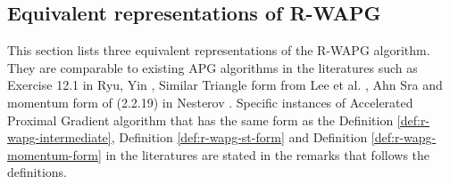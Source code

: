 \documentclass[12pt]{article}
\begin{document}
    \subsection{Equivalent representations of R-WAPG}
        This section lists three equivalent representations of the R-WAPG algorithm. 
        They are comparable to existing APG algorithms in the literatures such as Exercise 12.1 in Ryu, Yin \cite{ryu_large-scale_2022}, Similar Triangle form from Lee et al. \cite{lee_geometric_2021}, Ahn Sra \cite{ahn_understanding_2022} and momentum form of (2.2.19) in Nesterov \cite{nesterov_lectures_2018}. 
        Specific instances of Accelerated Proximal Gradient algorithm that has the same form as the Definition \ref{def:r-wapg-intermediate}, Definition \ref{def:r-wapg-st-form} and Definition \ref{def:r-wapg-momentum-form} in the literatures are stated in the remarks that follows the definitions. 
\end{document}
